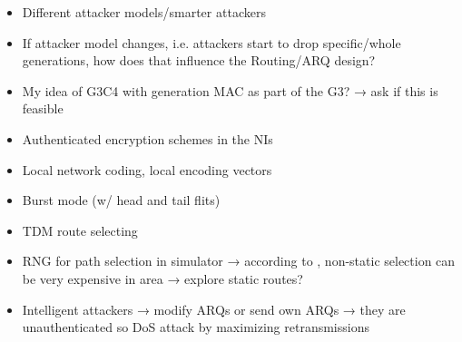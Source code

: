 \begin{itemize}
    \item Different attacker models/smarter attackers
    \item If attacker model changes, i.e. attackers start to drop specific/whole generations,
        how does that influence the Routing/ARQ design?
    \item My idea of G3C4 with generation MAC as part of the G3? → ask if this is feasible
    \item Authenticated encryption schemes in the NIs
    \item Local network coding, local encoding vectors
    \item Burst mode (w/ head and tail flits)
    \item TDM route selecting
    \item RNG for path selection in simulator → according to \cite{stefan11enhancingnocs}, non-static selection can be very expensive in area →
        explore static routes?
    \item Intelligent attackers → modify ARQs or send own ARQs → they are unauthenticated so DoS attack by maximizing retransmissions
\end{itemize}
